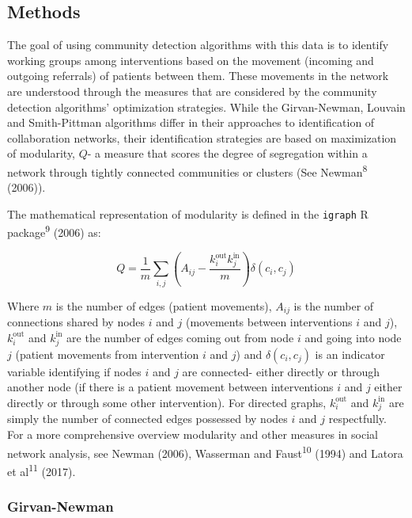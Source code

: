 \documentclass{article}
\begin{document}
\subsection{Methods}\label{methods}

The goal of using community detection algorithms with this data is to
identify working groups among interventions based on the movement
(incoming and outgoing referrals) of patients between them. These
movements in the network are understood through the measures that are
considered by the community detection algorithms' optimization
strategies. While the Girvan-Newman, Louvain and Smith-Pittman
algorithms differ in their approaches to identification of collaboration
networks, their identification strategies are based on maximization of
modularity, \(Q\)- a measure that scores the degree of segregation
within a network through tightly connected communities or clusters (See
Newman\textsuperscript{8} (2006)).

The mathematical representation of modularity is defined in the
\texttt{igraph} R package\textsuperscript{9} (2006) as:

\[Q = \frac{1}{m}\sum_{i,j}^{}\left( A_{ij} - \frac{k_{i}^{\text{out}}k_{j}^{\text{in}}}{m} \right)\delta\left( c_{i},c_{j} \right)\]

Where \(m\) is the number of edges (patient movements), \(A_{ij}\) is
the number of connections shared by nodes \(i\) and \(j\) (movements
between interventions \(i\) and \(j\)), \(k_{i}^{\text{out}}\) and
\(k_{j}^{\text{in}}\) are the number of edges coming out from node \(i\)
and going into node \(j\) (patient movements from intervention \(i\) and
\(j\)) and \(\delta\left( c_{i},c_{j} \right)\) is an indicator variable
identifying if nodes \(i\) and \(j\) are connected- either directly or
through another node (if there is a patient movement between
interventions \(i\) and \(j\) either directly or through some other
intervention). For directed graphs, \(k_{i}^{\text{out}}\) and
\(k_{j}^{\text{in}}\) are simply the number of connected edges possessed
by nodes \(i\) and \(j\) respectfully. For a more comprehensive overview
modularity and other measures in social network analysis, see Newman
(2006), Wasserman and Faust\textsuperscript{10} (1994) and Latora et
al\textsuperscript{11} (2017).

\subsubsection{Girvan-Newman}\label{girvan-newman}
\end{document}
